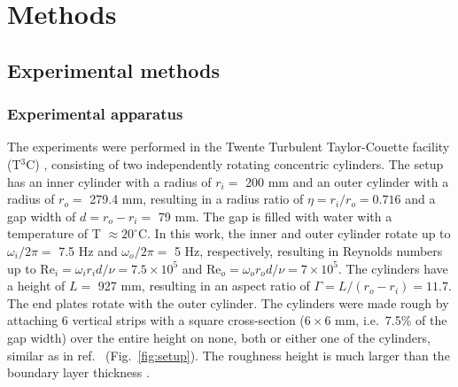 \documentclass[aps,prl,superscriptaddress,preprint]{revtex4}
\newcommand{\blue}[1]{{\textcolor{blue}{#1}}}
\newcommand{\annotation}[1]{\blue{[\textit{#1}]}}
\begin{document}
\newpage







\newpage



\newpage
\section{Methods}



\subsection{Experimental methods}

\subsubsection{Experimental apparatus}
The experiments were performed in the Twente Turbulent Taylor-Couette facility (T$^3$C) \cite{gil11a}, consisting of two independently rotating concentric cylinders. The setup has an inner cylinder with a radius of $r_i=$ 200 mm and an outer cylinder with a radius of $r_o=$ 279.4 mm, resulting in a radius ratio of $\eta = r_i/r_o = 0.716$ and a gap width of $d=r_o-r_i=$ 79 mm. The gap is filled with water with a temperature of T $ \approx 20 ^{\circ}$C. In this work, the inner and outer cylinder rotate up to $\omega_i/2\pi=$ 7.5 Hz and $\omega_o/2\pi=$ 5 Hz, respectively, resulting in Reynolds numbers up to $\text{Re}_i = \omega_i r_i d/\nu = 7.5 \times 10^5$ and $\text{Re}_o= \omega_o r_o d/\nu = 7 \times 10^5$. The cylinders have a height of $L =$ 927 mm, resulting in an aspect ratio of $\Gamma = L/(r_o-r_i) = 11.7$. The end plates rotate with the outer cylinder.
The cylinders were made rough by attaching 6 vertical strips with a square cross-section ($6 \times 6$ mm, i.e.\ 7.5\% of the gap width) over the entire height on none, both or either one of the cylinders, similar as in ref.\ \cite{ber03, cad97} (Fig.\ \ref{fig:setup}). The roughness height is much larger than the boundary layer thickness \cite{hui13}. 
\end{document}
